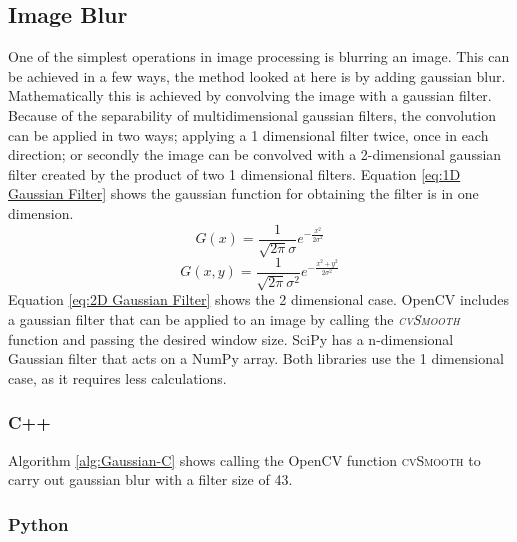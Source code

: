 \documentclass[english]{IEEEtran}
\newcommand{\noun}[1]{\textsc{#1}}
\theoremstyle{plain}
\begin{document}
\subsection{Image Blur}

One of the simplest operations in image processing is blurring an
image. This can be achieved in a few ways, the method looked at here
is by adding gaussian blur. Mathematically this is achieved by convolving
the image with a gaussian filter. Because of the separability of multidimensional
gaussian filters\cite{young1995recursive}, the convolution can be
applied in two ways; applying a 1 dimensional filter twice, once in
each direction; or secondly the image can be convolved with a 2-dimensional
gaussian filter created by the product of two 1 dimensional filters.
Equation \ref{eq:1D Gaussian Filter} shows the gaussian function
for obtaining the filter is in one dimension\cite{SS01}. \begin{equation}
G\left(x\right)=\frac{1}{\sqrt{2\pi}\sigma}e^{-\frac{x^{2}}{2\sigma^{2}}}\label{eq:1D Gaussian Filter}\end{equation}
\begin{equation}
G\left(x,y\right)=\frac{1}{\sqrt{2\pi}\sigma^{2}}e^{-\frac{x^{2}+y^{2}}{2\sigma^{2}}}\label{eq:2D Gaussian Filter}\end{equation}
Equation \ref{eq:2D Gaussian Filter} shows the 2 dimensional case\cite{SS01}.
OpenCV includes a gaussian filter that can be applied to an image
by calling the \emph{\noun{cvSmooth}} function and passing the desired
window size. SciPy has a n-dimensional Gaussian filter that acts on
a NumPy array. Both libraries use the 1 dimensional case, as it requires
less calculations.


\subsubsection{C++}

Algorithm \ref{alg:Gaussian-C} shows calling the OpenCV function
\noun{cvSmooth} to carry out gaussian blur with a filter size of 43. 


\subsubsection{Python}
\end{document}
